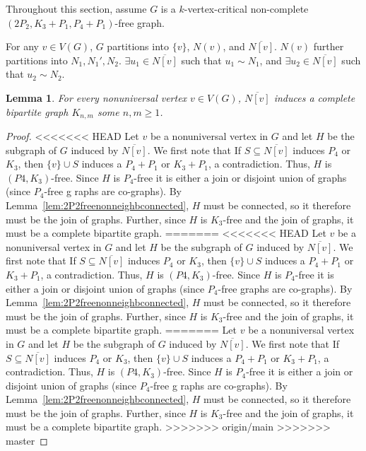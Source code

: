 \documentclass[11pt]{article}
\newtheorem{lemma}[theorem]{Lemma}
\theoremstyle{definition}
\newcommand{\forbid}{$(2P_2, K_3+P_1,P_4+P_1)$}
\newcommand{\noneighbs}{\overline{N[v]}}
\begin{document}
Throughout this section, assume $G$ is a $k$-vertex-critical non-complete \forbid -free graph.

For any $v\in V(G)$, $G$ partitions into $\{v\}$, $N(v)$, and $\overline{N[v]}$. $N(v)$ further partitions into $N_1, N_1', N_2$. $\exists u_1 \in \noneighbs$ such that $u_1 \sim N_1$, and $\exists u_2 \in \noneighbs$ such that $u_2 \sim N_2$.

\begin{lemma}\label{lem:completebipartite}
For every nonuniversal vertex $v\in V(G)$,  $\noneighbs$ induces a complete bipartite graph $K_{n,m}$ some $n,m\ge 1$.
\end{lemma}
\begin{proof}
<<<<<<< HEAD
Let $v$ be a nonuniversal vertex in $G$ and let $H$ be the subgraph of $G$ induced by $\noneighbs$. We first note that If $S\subseteq\noneighbs$ induces $P_4$ or $K_3$, then $\{v\}\cup S$ induces a $P_4+P_1$ or $K_3+P_1$, a contradiction. Thus, $H$ is $(P4, K_3)$-free. Since $H$ is $P_4$-free it is either a join or disjoint union of graphs (since $P_4$-free g raphs are co-graphs). By Lemma~\ref{lem:2P2freenonneighbconnected}, $H$ must be connected, so it therefore must be the join of graphs. Further, since $H$ is $K_3$-free and the join of graphs, it must be a complete bipartite graph. 
=======
<<<<<<< HEAD
Let $v$ be a nonuniversal vertex in $G$ and let $H$ be the subgraph of $G$ induced by $\noneighbs$. We first note that If $S\subseteq\noneighbs$ induces $P_4$ or $K_3$, then $\{v\}\cup S$ induces a $P_4+P_1$ or $K_3+P_1$, a contradiction. Thus, $H$ is $(P4, K_3)$-free. Since $H$ is $P_4$-free it is either a join or disjoint union of graphs (since $P_4$-free graphs are co-graphs). By Lemma~\ref{lem:2P2freenonneighbconnected}, $H$ must be connected, so it therefore must be the join of graphs. Further, since $H$ is $K_3$-free and the join of graphs, it must be a complete bipartite graph. 
=======
Let $v$ be a nonuniversal vertex in $G$ and let $H$ be the subgraph of $G$ induced by $\noneighbs$. We first note that If $S\subseteq\noneighbs$ induces $P_4$ or $K_3$, then $\{v\}\cup S$ induces a $P_4+P_1$ or $K_3+P_1$, a contradiction. Thus, $H$ is $(P4, K_3)$-free. Since $H$ is $P_4$-free it is either a join or disjoint union of graphs (since $P_4$-free g raphs are co-graphs). By Lemma~\ref{lem:2P2freenonneighbconnected}, $H$ must be connected, so it therefore must be the join of graphs. Further, since $H$ is $K_3$-free and the join of graphs, it must be a complete bipartite graph. 
>>>>>>> origin/main
>>>>>>> master
\end{proof}
\end{document}
